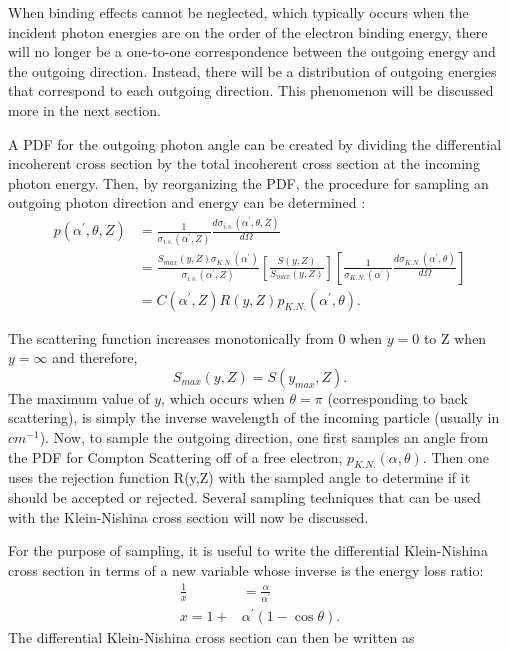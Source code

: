 When binding effects cannot be neglected, which typically occurs when the 
incident photon energies are on the order of the electron binding energy, there 
will no longer be a one-to-one correspondence between the outgoing energy and 
the outgoing direction. Instead, there will be a distribution of outgoing 
energies that correspond to each outgoing direction. This phenomenon will be 
discussed more in the next section.

A PDF for the outgoing photon angle can be created by dividing the differential
incoherent cross section by the total incoherent cross section at the incoming
photon energy. Then, by reorganizing the PDF, the procedure for sampling an
outgoing photon direction and energy can be determined 
\citep{persliden_monte_1983}:
\begin{align}
  p(\alpha^{'},\theta,Z) & = \frac{1}{\sigma_{i.s.}(\alpha^{'},Z)}
  \frac{d\sigma_{i.s.}(\alpha^{'},\theta,Z)}{d\Omega} \nonumber \\
  & = \frac{S_{max}(y,Z) \sigma_{K.N.}(\alpha^{'})}{\sigma_{i.s.}(\alpha^{'},Z)}
  \left[ \frac{S(y,Z)}{S_{max}(y,Z)} \right]
  \left[ \frac{1}{\sigma_{K.N.}(\alpha^{'})} 
    \frac{d\sigma_{K.N.}(\alpha^{'},\theta)}
         {d\Omega} \right] \nonumber \\
  & = C(\alpha^{'},Z) R(y,Z) p_{K.N.}(\alpha^{'},\theta).
  \label{eq:incoherent_sampling_pdf}
\end{align}

The scattering function increases monotonically from 0 when $y=0$ to Z when
$y=\infty$ and therefore,
\begin{equation*} 
S_{max}(y,Z) = S(y_{max},Z).
\end{equation*}
The maximum value of $y$, which occurs when $\theta = \pi$ (corresponding to
back scattering), is simply the inverse wavelength of the incoming 
particle (usually in $cm^{-1}$). Now, to sample the outgoing direction, one 
first samples an angle from the PDF for Compton Scattering off of a free 
electron, $p_{K.N.}(\alpha,\theta)$. Then one uses the rejection function R(y,Z)
with the sampled angle to determine if it should be accepted or rejected. 
Several sampling techniques that can be used with the Klein-Nishina cross 
section will now be discussed.

For the purpose of sampling, it is useful to write the differential 
Klein-Nishina cross section in terms of a new variable whose inverse is the 
energy loss ratio:
\begin{align}
  \frac{1}{x} & = \frac{\alpha}{\alpha^{'}} \\
  x = 1+&\alpha^{'}(1-\cos{\theta}).
\end{align}
The differential Klein-Nishina cross section can then be written as

